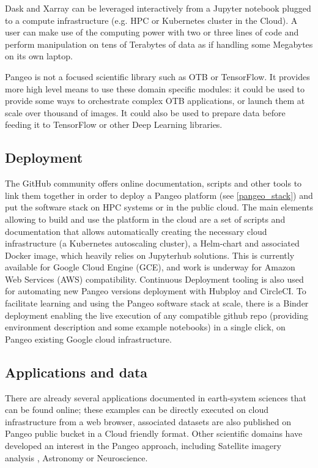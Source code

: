 \documentclass{article}
\begin{document}
Dask and Xarray can be leveraged interactively from a Jupyter notebook plugged to
a compute infrastructure (e.g. HPC or Kubernetes cluster in the Cloud). A user
can make use of the computing power with two or three lines of code and perform
manipulation on tens of Terabytes of data as if handling some Megabytes on its
own laptop.

Pangeo is not a focused scientific library such as OTB or TensorFlow.
It provides more high level means to use these domain specific modules: 
it could be used to provide some ways to orchestrate complex OTB applications,
or launch them at scale over thousand of images. It could also be used to prepare 
data before feeding it to TensorFlow or other Deep Learning libraries.


\subsection{Deployment}
\label{ssec:deployment}

The GitHub community offers online documentation, scripts and other tools to link them together in order to deploy a Pangeo platform (see \ref{pangeo_stack}) and put the software stack on HPC systems or in the public cloud. The main elements allowing to build and use the platform in the cloud are a set of scripts and documentation that allows automatically creating the necessary cloud infrastructure (a Kubernetes autoscaling cluster), a Helm-chart and associated Docker image, which heavily relies on Jupyterhub solutions. This is currently available for Google Cloud Engine (GCE), and work is underway for Amazon Web Services (AWS) compatibility. Continuous Deployment tooling is also used for automating new Pangeo versions deployment with Hubploy and CircleCI. To facilitate learning and using the Pangeo software stack at scale, there is a Binder deployment\cite{b8} enabling the live execution of any compatible github repo (providing environment description and some example notebooks) in a single click, on Pangeo existing Google cloud infrastructure.


\subsection{Applications and data}
\label{ssec:applications}

There are already several applications documented in earth-system sciences that can be found online\cite{b5}; these examples can be directly executed on cloud infrastructure from a web browser, associated datasets are also published on Pangeo public bucket in a Cloud friendly format. 
Other scientific domains have developed an interest in the Pangeo approach, including Satellite imagery analysis \cite{b6}, Astronomy or Neuroscience.
\end{document}
